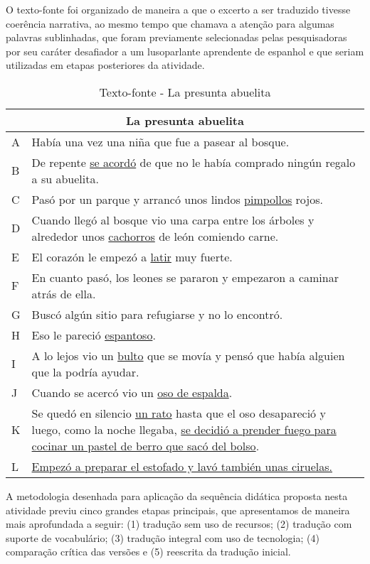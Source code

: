 \documentclass[portuguese]{textolivre}
\begin{document}
O texto-fonte foi organizado de maneira a que o excerto a ser traduzido tivesse coerência narrativa, ao mesmo tempo que chamava a atenção para algumas palavras sublinhadas, que foram previamente selecionadas pelas pesquisadoras por seu caráter desafiador a um lusoparlante aprendente de espanhol e que seriam utilizadas em etapas posteriores da atividade.

\begin{table}[H]
\centering
\caption{Texto-fonte - La presunta abuelita}
\label{quadro1}
\begin{tabular}{l p{13.6cm}}
\toprule 
\multicolumn{2}{c}{La presunta abuelita} \\
\midrule
A & Había una vez una niña que fue a pasear al bosque.\\ 
B & De repente \underline{se acordó} de que no le había comprado ningún regalo a su abuelita. \\  
C & Pasó por un parque y arrancó unos lindos \underline{pimpollos} rojos. \\
D & Cuando llegó al bosque vio una carpa entre los árboles y alrededor unos \underline{cachorros} de león comiendo carne. \\
E & El corazón le empezó a \underline{latir} muy fuerte.\\
F & En cuanto pasó, los leones se pararon y empezaron a caminar atrás de ella.\\
G & Buscó algún sitio para refugiarse y no lo encontró. \\
H & Eso le pareció \underline{espantoso}. \\
I & A lo lejos vio un \underline{bulto} que se movía y pensó que había alguien que la podría ayudar. \\
J & Cuando se acercó vio un \underline{oso de espalda}. \\
K & Se quedó en silencio \underline{un rato} hasta que el oso desapareció y luego, como la noche llegaba, \underline{se decidió a prender fuego para cocinar un pastel de berro que sacó del bolso}. \\
L & \underline{Empezó a preparar el estofado y lavó también unas ciruelas.} \\
\bottomrule
\end{tabular}
\end{table}

A metodologia desenhada para aplicação da sequência didática proposta nesta atividade previu cinco grandes etapas principais, que apresentamos de maneira mais aprofundada a seguir: (1) tradução sem uso de recursos; (2) tradução com suporte de vocabulário; (3) tradução integral com uso de tecnologia; (4) comparação crítica das versões e (5) reescrita da tradução inicial.
\end{document}
